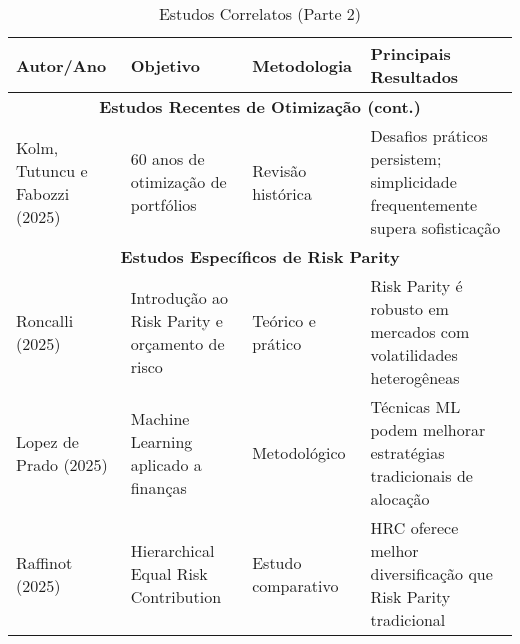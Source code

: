 \begin{table}[H]
\centering
\caption{Estudos Correlatos (Parte 2)}
\begin{tabular}{|p{2.3cm}|p{3.2cm}|p{2.6cm}|p{3.2cm}|}
\hline
\textbf{Autor/Ano} & \textbf{Objetivo} & \textbf{Metodologia} & \textbf{Principais Resultados} \\
\hline
\multicolumn{4}{|c|}{\textbf{Estudos Recentes de Otimização (cont.)}} \\
\hline
Kolm, Tutuncu e Fabozzi (2025) & 60 anos de otimização de portfólios & Revisão histórica & Desafios práticos persistem; simplicidade frequentemente supera sofisticação \\
\hline
\multicolumn{4}{|c|}{\textbf{Estudos Específicos de Risk Parity}} \\
\hline
Roncalli (2025) & Introdução ao Risk Parity e orçamento de risco & Teórico e prático & Risk Parity é robusto em mercados com volatilidades heterogêneas \\
\hline
Lopez de Prado (2025) & Machine Learning aplicado a finanças & Metodológico & Técnicas ML podem melhorar estratégias tradicionais de alocação \\
\hline
Raffinot (2025) & Hierarchical Equal Risk Contribution & Estudo comparativo & HRC oferece melhor diversificação que Risk Parity tradicional \\
\hline
\end{tabular}
\label{tab:estudos_correlatos_2}
\end{table}

